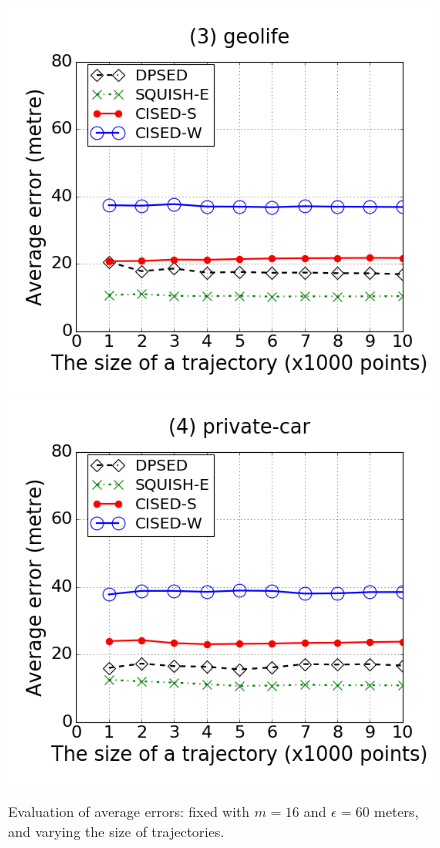 \begin{figure}[tb!]
\includegraphics[scale = 0.240]{Figures/Exp-error-size-geolife.png}
\includegraphics[scale = 0.240]{Figures/Exp-error-size-private.png}
\vspace{-1ex}
\caption{\small Evaluation of average errors: fixed with $m=16$ and $\epsilon=60$ meters, and varying the size of trajectories.}
\label{fig:ae-size}
\vspace{-1ex}
\end{figure}


